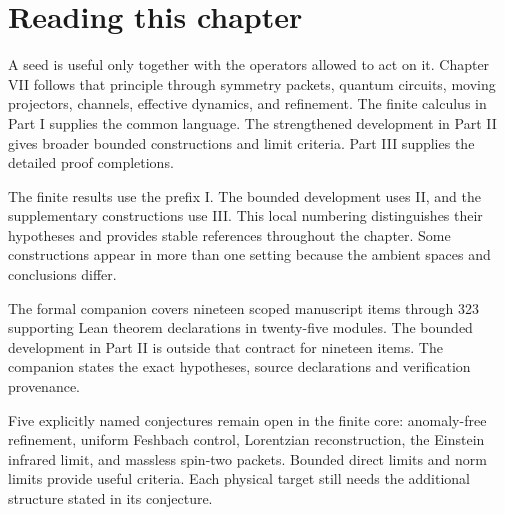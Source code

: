 \documentclass[11pt,letterpaper]{article}
\theoremstyle{definition}
\theoremstyle{remark}
\begin{document}
\KomorebiCover
\begingroup
\setlength{\parskip}{3pt plus .5pt minus .5pt}

\section*{Reading this chapter}
A seed is useful only together with the operators allowed to act on it. Chapter VII follows that principle through symmetry packets, quantum circuits, moving projectors, channels, effective dynamics, and refinement. The finite calculus in Part I supplies the common language. The strengthened development in Part II gives broader bounded constructions and limit criteria. Part III supplies the detailed proof completions.

The finite results use the prefix I. The bounded development uses II, and the supplementary constructions use III. This local numbering distinguishes their hypotheses and provides stable references throughout the chapter. Some constructions appear in more than one setting because the ambient spaces and conclusions differ.

The formal companion covers nineteen scoped manuscript items through 323 supporting Lean theorem declarations in twenty-five modules. The bounded development in Part II is outside that contract for nineteen items. The companion states the exact hypotheses, source declarations and verification provenance.

Five explicitly named conjectures remain open in the finite core: anomaly-free refinement, uniform Feshbach control, Lorentzian reconstruction, the Einstein infrared limit, and massless spin-two packets. Bounded direct limits and norm limits provide useful criteria. Each physical target still needs the additional structure stated in its conjecture.
\end{document}
